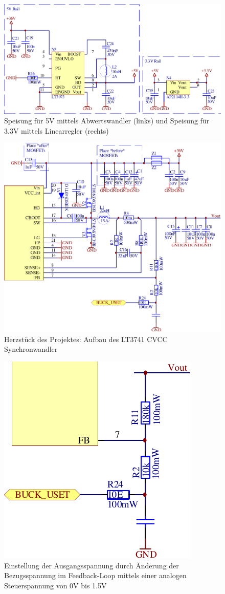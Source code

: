\begin{figure}[H]
    \center
    \includegraphics[width=.75\textwidth]{images/circuit/5v-3v-rails.pdf}
    \caption{Speisung f\"ur 5V mittels Abwertswandler (links) und Speisung f\"ur 3.3V mittels Linearregler (rechts)}
    \label{fig:circuit:rails}
\end{figure}

\begin{figure}[H]
    \center
    \includegraphics[width=.75\textwidth]{images/circuit/buck.pdf}
    \caption{Herzst\"uck des Projektes: Aufbau des LT3741 CVCC Synchronwandler}
    \label{fig:circuit:buck}
\end{figure}

\begin{figure}[H]
    \center
    \includegraphics[width=.35\textwidth]{images/circuit/buck-uset.pdf}
    \caption{Einstellung der Ausgangsspannung durch \"Anderung der Bezugsspannung im Feedback-Loop mittels einer analogen Steuerspannung von 0V bis 1.5V}
    \label{fig:circuit:buck:uset}
\end{figure}

